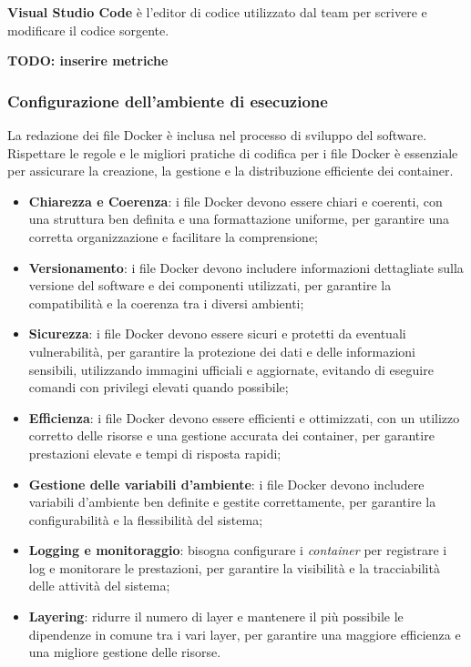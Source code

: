 \textbf{Visual Studio Code} è l'editor di codice utilizzato dal team per scrivere e modificare il codice sorgente.

\textbf{TODO: inserire metriche}

\subsubsection{Configurazione dell'ambiente di esecuzione}
La redazione dei file Docker è inclusa nel processo di sviluppo del software. Rispettare le regole e le migliori pratiche di codifica per i file Docker è essenziale per assicurare la creazione, la gestione e la distribuzione efficiente dei container.\\
\begin{itemize}
	\item \textbf{Chiarezza e Coerenza}: i file Docker devono essere chiari e coerenti, con una struttura ben definita e una formattazione uniforme, per garantire una corretta organizzazione e facilitare la comprensione;
	\item \textbf{Versionamento}: i file Docker devono includere informazioni dettagliate sulla versione del software e dei componenti utilizzati, per garantire la compatibilità e la coerenza tra i diversi ambienti;
	\item \textbf{Sicurezza}: i file Docker devono essere sicuri e protetti da eventuali vulnerabilità, per garantire la protezione dei dati e delle informazioni sensibili, utilizzando immagini ufficiali e aggiornate, evitando di eseguire comandi con privilegi elevati quando possibile;
	\item \textbf{Efficienza}: i file Docker devono essere efficienti e ottimizzati, con un utilizzo corretto delle risorse e una gestione accurata dei container, per garantire prestazioni elevate e tempi di risposta rapidi;
	\item \textbf{Gestione delle variabili d'ambiente}: i file Docker devono includere variabili d'ambiente ben definite e gestite correttamente, per garantire la configurabilità e la flessibilità del sistema;
	\item \textbf{Logging e monitoraggio}: bisogna configurare i \textit{container} per registrare i log e monitorare le prestazioni, per garantire la visibilità e la tracciabilità delle attività del sistema;
	\item \textbf{Layering}: ridurre il numero di layer e mantenere il più possibile le dipendenze in comune tra i vari layer, per garantire una maggiore efficienza e una migliore gestione delle risorse.

\end{itemize}
